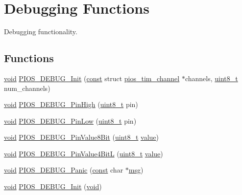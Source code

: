\hypertarget{group___p_i_o_s___d_e_b_u_g}{\section{Debugging Functions}
\label{group___p_i_o_s___d_e_b_u_g}
}


Debugging functionality.  


\subsection*{Functions}
\begin{DoxyCompactItemize}
\item 
\hyperlink{group___n_a_m_e_ga18028b8badbf1ea7e704ccac3c488e82}{void} \hyperlink{group___p_i_o_s___d_e_b_u_g_ga798f6007adad3e5de566d49c17695899}{P\-I\-O\-S\-\_\-\-D\-E\-B\-U\-G\-\_\-\-Init} (\hyperlink{group___n_a_m_e_ga7ae6d0e43244213b34de2c2b9aa30da6}{const} struct \hyperlink{structpios__tim__channel}{pios\-\_\-tim\-\_\-channel} $\ast$channels, \hyperlink{stdint_8h_aba7bc1797add20fe3efdf37ced1182c5}{uint8\-\_\-t} num\-\_\-channels)
\item 
\hyperlink{group___n_a_m_e_ga18028b8badbf1ea7e704ccac3c488e82}{void} \hyperlink{group___p_i_o_s___d_e_b_u_g_ga7eabdd0ec4d323e1ae683708e32694a3}{P\-I\-O\-S\-\_\-\-D\-E\-B\-U\-G\-\_\-\-Pin\-High} (\hyperlink{stdint_8h_aba7bc1797add20fe3efdf37ced1182c5}{uint8\-\_\-t} pin)
\item 
\hyperlink{group___n_a_m_e_ga18028b8badbf1ea7e704ccac3c488e82}{void} \hyperlink{group___p_i_o_s___d_e_b_u_g_ga8ac0ce4c2f2fa85c17f8de9740bc2026}{P\-I\-O\-S\-\_\-\-D\-E\-B\-U\-G\-\_\-\-Pin\-Low} (\hyperlink{stdint_8h_aba7bc1797add20fe3efdf37ced1182c5}{uint8\-\_\-t} pin)
\item 
\hyperlink{group___n_a_m_e_ga18028b8badbf1ea7e704ccac3c488e82}{void} \hyperlink{group___p_i_o_s___d_e_b_u_g_ga2e5f7854424b8a04f1972f6cdd13fdbd}{P\-I\-O\-S\-\_\-\-D\-E\-B\-U\-G\-\_\-\-Pin\-Value8\-Bit} (\hyperlink{stdint_8h_aba7bc1797add20fe3efdf37ced1182c5}{uint8\-\_\-t} \hyperlink{protocol_8h_a4e9aec275e566b978a3ccb4e043d8c61}{value})
\item 
\hyperlink{group___n_a_m_e_ga18028b8badbf1ea7e704ccac3c488e82}{void} \hyperlink{group___p_i_o_s___d_e_b_u_g_ga4d4cd4268ab3201b753eadde5a58c0b4}{P\-I\-O\-S\-\_\-\-D\-E\-B\-U\-G\-\_\-\-Pin\-Value4\-Bit\-L} (\hyperlink{stdint_8h_aba7bc1797add20fe3efdf37ced1182c5}{uint8\-\_\-t} \hyperlink{protocol_8h_a4e9aec275e566b978a3ccb4e043d8c61}{value})
\item 
\hyperlink{group___n_a_m_e_ga18028b8badbf1ea7e704ccac3c488e82}{void} \hyperlink{group___p_i_o_s___d_e_b_u_g_gae3876733b5e6b40c8fcbdb683d206068}{P\-I\-O\-S\-\_\-\-D\-E\-B\-U\-G\-\_\-\-Panic} (\hyperlink{group___n_a_m_e_ga7ae6d0e43244213b34de2c2b9aa30da6}{const} char $\ast$\hyperlink{group___o_s_d_module_ga31fe24ba18a63ea1e8cdb622e7ece509}{msg})
\item 
\hyperlink{group___n_a_m_e_ga18028b8badbf1ea7e704ccac3c488e82}{void} \hyperlink{group___p_i_o_s___d_e_b_u_g_gabbc10ed2b3c2b4a793433668661c37c1}{P\-I\-O\-S\-\_\-\-D\-E\-B\-U\-G\-\_\-\-Init} (\hyperlink{group___n_a_m_e_ga18028b8badbf1ea7e704ccac3c488e82}{void})
\end{DoxyCompactItemize}
